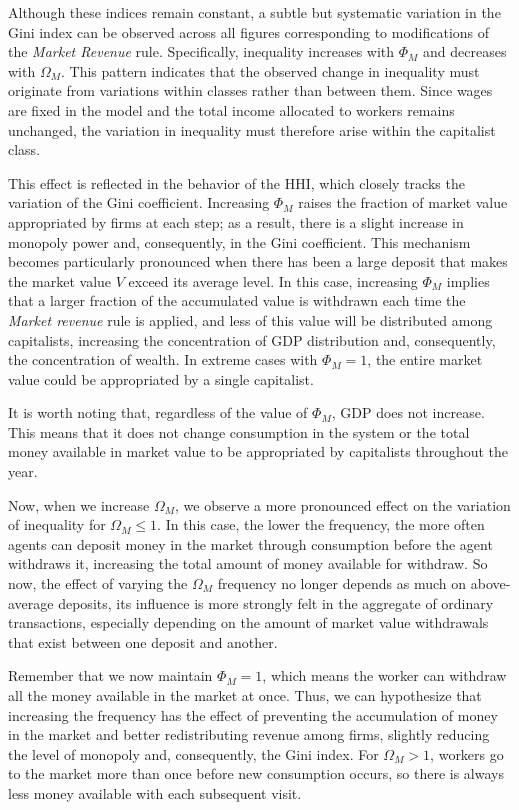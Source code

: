Although these indices remain constant, a subtle but systematic variation in the Gini index can be observed across all figures corresponding to modifications of the {\it Market Revenue} rule. Specifically, inequality increases with $\Phi_M$ and decreases with $\Omega_M$. 
This pattern indicates that the observed change in inequality must originate from variations within classes rather than between them. Since wages are fixed in the model and the total income allocated to workers remains unchanged, the variation in inequality must therefore arise within the capitalist class.

This effect is reflected in the behavior of the HHI, which closely tracks the variation of the Gini coefficient. Increasing $\Phi_M$ raises the fraction of market value appropriated by firms at each step; as a result, there is a slight increase in monopoly power and, consequently, in the Gini coefficient.  
%
This mechanism becomes particularly pronounced when there has been a large deposit that makes the market value $V$ exceed its average level. 
In this case,  increasing $\Phi_M$ implies that a larger fraction of the accumulated value is withdrawn each time the {\it Market revenue} rule is applied, and less of this value will be distributed among capitalists, increasing the concentration of GDP distribution and, consequently, the concentration of wealth. In extreme cases with $\Phi_M=1$, the entire market value could be appropriated by a single capitalist.

It is worth noting that, regardless of the value of $\Phi_M$, GDP does not increase. This means that it does not change consumption in the system or the total money available in market value to be appropriated by capitalists throughout the year. 

Now, when we increase $\Omega_M$, we observe a more pronounced effect on the variation of inequality for $\Omega_M\leq 1$. In this case, the lower the frequency, the more often agents can deposit money in the market through consumption before the agent withdraws it, increasing the total amount of money available for withdraw. 
%
So now, the effect of varying the $\Omega_M$ frequency no longer depends as much on above-average deposits, its influence is more strongly felt in the aggregate of ordinary transactions, especially depending on the amount of market value withdrawals that exist between one deposit and another.

Remember that we now maintain $\Phi_M=1$, which means the worker can withdraw all the money available in the market at once. Thus, we can hypothesize that increasing the frequency has the effect of preventing the accumulation of money in the market and better redistributing revenue among firms, slightly reducing the level of monopoly and, consequently, the Gini index. For $\Omega_M>1$, workers go to the market more than once before new consumption occurs, so there is always less money available with each subsequent visit.  

